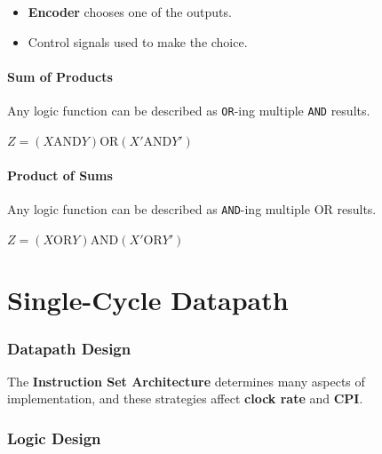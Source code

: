 \documentclass[12pt, letterpaper]{article}
\begin{document}
\begin{itemize}
  \item \textbf{Encoder} chooses one of the outputs.
  \item Control signals used to make the choice.
\end{itemize}

\subsection*{Sum of Products}

Any logic function can be described as \texttt{OR}-ing multiple
\texttt{AND} results.
\medskip

\medskip
{\centering

  $ Z = (X \textrm{AND} Y) \textrm{OR} (X' \textrm{AND} Y') $

}
\medskip


\subsection*{Product of Sums}

Any logic function can be described as \texttt{AND}-ing multiple
\textrm{OR} results.

\medskip
{\centering

  $ Z = (X \textrm{OR} Y) \textrm{AND} (X' \textrm{OR} Y') $

}
\medskip


\part*{Single-Cycle Datapath}

\section*{Datapath Design}

The \textbf{Instruction Set Architecture} determines many aspects of
implementation, and these strategies affect \textbf{clock rate} and
\textbf{CPI}.

\section*{Logic Design}
\end{document}
